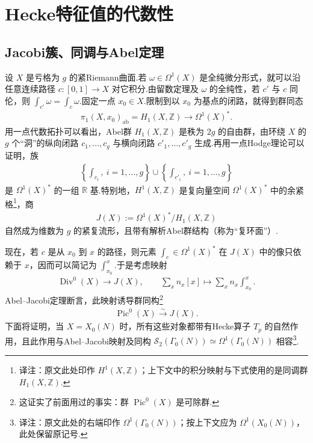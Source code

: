 \section{Hecke特征值的代数性}\label{sec:modular-2-2}

\subsection{Jacobi簇、同调与Abel定理}\label{sec:modular-2-2-1}

设 $X$ 是亏格为 $g$ 的紧Riemann曲面.若 $\omega\in\Omega^1(X)$ 是全纯微分形式，就可以沿任意连续路径 $c:[0,1]\longrightarrow X$ 对它积分.由留数定理及 $\omega$ 的全纯性，若 $c'$ 与 $c$ 同伦，则 $\int_{c'}\omega=\int_c\omega$.固定一点 $x_0\in X$.限制到以 $x_0$ 为基点的闭路，就得到群同态
\begin{align*}
\pi_1(X,x_0)_{\mathrm{ab}}=H_1(X,\mathbb Z)\longrightarrow\Omega^1(X)^*.
\end{align*}
用一点代数拓扑可以看出，Abel群 $H_1(X,\mathbb Z)$ 是秩为 $2g$ 的自由群，由环绕 $X$ 的 $g$ 个``洞''的纵向闭路 $c_1,\ldots,c_g$ 与横向闭路 $c'_1,\ldots,c'_g$ 生成.再用一点Hodge理论可以证明，族
\begin{align*}
\left\{\int_{c_i},\ i=1,\ldots,g\right\}\cup\left\{\int_{c'_i},\ i=1,\ldots,g\right\}
\end{align*}
是 $\Omega^1(X)^*$ 的一组 $\mathbb R$ 基.特别地，$H^1(X,\mathbb Z)$ 是复向量空间 $\Omega^1(X)^*$ 中的余紧格\footnote{译注：原文此处印作 $H^1(X,\mathbb Z)$；上下文中的积分映射与下式使用的是同调群 $H_1(X,\mathbb Z)$.}，商
\begin{align*}
J(X):=\Omega^1(X)^*/H_1(X,\mathbb Z)
\end{align*}
自然成为维数为 $g$ 的紧复流形，且带有解析Abel群结构（称为``复环面''）.



现在，若 $c$ 是从 $x_0$ 到 $x$ 的路径，则元素 $\int_c\in\Omega^1(X)^*$ 在 $J(X)$ 中的像只依赖于 $x$，因而可以简记为 $\int_{x_0}^x$.于是考虑映射
\begin{align*}
\operatorname{Div}^0(X)\longrightarrow J(X),\qquad
\sum_x n_x[x]\longmapsto\sum_x n_x\int_{x_0}^x.
\end{align*}
Abel--Jacobi定理断言，此映射诱导群同构\footnote{这证实了前面用过的事实：群 $\operatorname{Pic}^0(X)$ 是可除群.}
\begin{align*}
\operatorname{Pic}^0(X)\xrightarrow{\sim}J(X).
\end{align*}
下面将证明，当 $X=X_0(N)$ 时，所有这些对象都带有Hecke算子 $T_p$ 的自然作用，且此作用与Abel--Jacobi映射及同构 $\mathcal S_2(\Gamma_0(N))\simeq\Omega^1(\Gamma_0(N))$ 相容\footnote{译注：原文此处的右端印作 $\Omega^1(\Gamma_0(N))$；按上下文应为 $\Omega^1(X_0(N))$，此处保留原记号.}.




